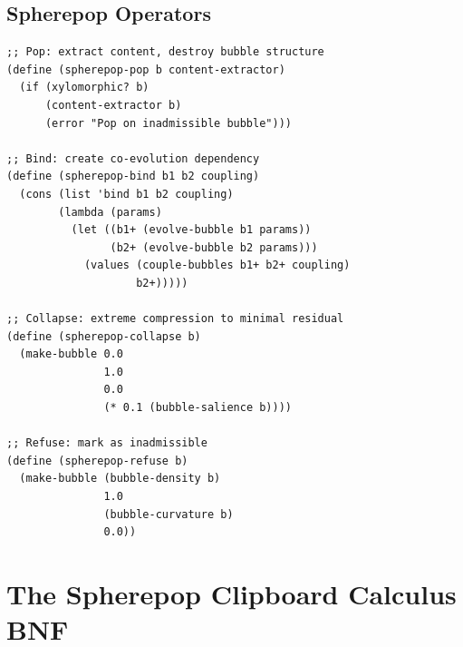 \documentclass[12pt,oneside]{book}
\theoremstyle{plain}
\theoremstyle{definition}
\theoremstyle{plain}
\begin{document}
\section{Spherepop Operators}

\begin{lstlisting}
;; Pop: extract content, destroy bubble structure
(define (spherepop-pop b content-extractor)
  (if (xylomorphic? b)
      (content-extractor b)
      (error "Pop on inadmissible bubble")))

;; Bind: create co-evolution dependency
(define (spherepop-bind b1 b2 coupling)
  (cons (list 'bind b1 b2 coupling)
        (lambda (params)
          (let ((b1+ (evolve-bubble b1 params))
                (b2+ (evolve-bubble b2 params)))
            (values (couple-bubbles b1+ b2+ coupling)
                    b2+)))))

;; Collapse: extreme compression to minimal residual
(define (spherepop-collapse b)
  (make-bubble 0.0
               1.0
               0.0
               (* 0.1 (bubble-salience b))))

;; Refuse: mark as inadmissible
(define (spherepop-refuse b)
  (make-bubble (bubble-density b)
               1.0
               (bubble-curvature b)
               0.0))
\end{lstlisting}

\chapter{The Spherepop Clipboard Calculus BNF}
\label{app:spherepop_bnf}
\end{document}
